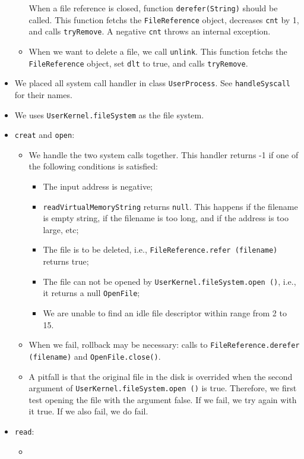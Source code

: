 \documentclass{article}
\begin{document}
\begin{itemize}
\begin{itemize}
	When a file reference is closed, function \texttt{derefer(String)} should be called.
	This function fetchs the \texttt{FileReference} object, decreases \texttt{cnt} by 1, and calls \texttt{tryRemove}.
	A negative \texttt{cnt} throws an internal exception.
	\item
	When we want to delete a file, we call \texttt{unlink}.
	This function fetchs the  \texttt{FileReference} object, set \texttt{dlt} to true, and calls \texttt{tryRemove}.
	\end{itemize}
\item
We placed all system call handler in class \texttt{UserProcess}. See \texttt{handleSyscall} for their names.
\item
We uses \texttt{UserKernel.fileSystem} as the file system.
\item \texttt{creat} and \texttt{open}:
\begin{itemize}
\item
We handle the two system calls together.
This handler returns -1 if one of the following conditions is satisfied:
\begin{itemize}
\item
The input address is negative;
\item
\texttt{readVirtualMemoryString} returns \texttt{null}. This happens if the filename is empty string, if the filename is too long, and if the address is too large, etc;
\item
The file is to be deleted, i.e., \texttt{FileReference.refer (filename)} returns true;
\item
The file can not be opened by \texttt{UserKernel.fileSystem.open ()}, i.e., it returns a null \texttt{OpenFile};
\item
We are unable to find an idle file descriptor within range from 2 to 15.
\end{itemize}
\item
When we fail, rollback may be necessary: calls to \texttt{FileReference.derefer (filename)} and \texttt{OpenFile.close()}.
\item
A pitfall is that the original file in the disk is overrided when the second argument of \texttt{UserKernel.fileSystem.open ()} is true.
Therefore, we first test opening the file with the argument false.
If we fail, we try again with it true.
If we also fail, we do fail.
\end{itemize}
\item
\texttt{read}:
\begin{itemize}
\item

\end{itemize}
\end{itemize}
\end{document}
